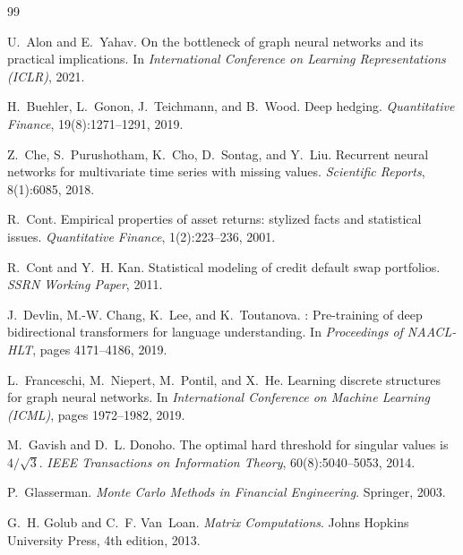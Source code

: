 \documentclass[11pt,a4paper]{article}
\begin{document}


\begin{thebibliography}{99}

U.~Alon and E.~Yahav.
\newblock On the bottleneck of graph neural networks and its practical
  implications.
\newblock In \emph{International Conference on Learning Representations
  (ICLR)}, 2021.

H.~Buehler, L.~Gonon, J.~Teichmann, and B.~Wood.
\newblock Deep hedging.
\newblock \emph{Quantitative Finance}, 19(8):1271--1291, 2019.

Z.~Che, S.~Purushotham, K.~Cho, D.~Sontag, and Y.~Liu.
\newblock Recurrent neural networks for multivariate time series with missing
  values.
\newblock \emph{Scientific Reports}, 8(1):6085, 2018.

R.~Cont.
\newblock Empirical properties of asset returns: stylized facts and statistical
  issues.
\newblock \emph{Quantitative Finance}, 1(2):223--236, 2001.

R.~Cont and Y.~H. Kan.
\newblock Statistical modeling of credit default swap portfolios.
\newblock \emph{SSRN Working Paper}, 2011.

J.~Devlin, M.-W. Chang, K.~Lee, and K.~Toutanova.
: Pre-training of deep bidirectional transformers for language
  understanding.
\newblock In \emph{Proceedings of NAACL-HLT}, pages 4171--4186, 2019.

L.~Franceschi, M.~Niepert, M.~Pontil, and X.~He.
\newblock Learning discrete structures for graph neural networks.
\newblock In \emph{International Conference on Machine Learning (ICML)}, pages
  1972--1982, 2019.

M.~Gavish and D.~L. Donoho.
\newblock The optimal hard threshold for singular values is $4/\sqrt{3}$.
\newblock \emph{IEEE Transactions on Information Theory}, 60(8):5040--5053,
  2014.

P.~Glasserman.
\newblock \emph{Monte Carlo Methods in Financial Engineering}.
\newblock Springer, 2003.

G.~H. Golub and C.~F. Van~Loan.
\newblock \emph{Matrix Computations}.
\newblock Johns Hopkins University Press, 4th edition, 2013.


\end{thebibliography}
\end{document}
